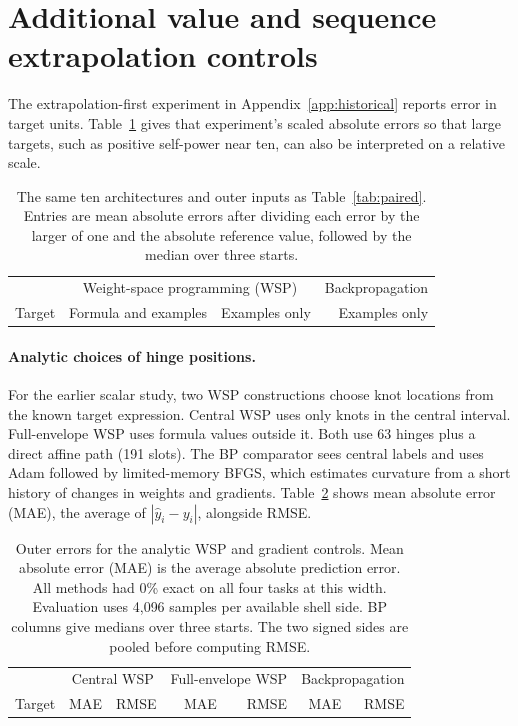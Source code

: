 \section{Additional value and sequence extrapolation controls}\label{app:additional}
The extrapolation-first experiment in Appendix~\ref{app:historical} reports error in target units. Table~\ref{tab:scaled} gives that experiment's scaled absolute errors so that large targets, such as positive self-power near ten, can also be interpreted on a relative scale.

\begin{table}[htbp]\centering\small
\caption{The same ten architectures and outer inputs as Table~\ref{tab:paired}. Entries are mean absolute errors after dividing each error by the larger of one and the absolute reference value, followed by the median over three starts.}\label{tab:scaled}
\begin{tabular}{@{}lrrr@{}}\toprule
&\multicolumn{2}{c}{Weight-space programming (WSP)}&Backpropagation\\
Target & Formula and examples & Examples only & Examples only\\\midrule
\end{tabular}\end{table}

\paragraph{Analytic choices of hinge positions.}
For the earlier scalar study, two WSP constructions choose knot locations from the known target expression. Central WSP uses only knots in the central interval. Full-envelope WSP uses formula values outside it. Both use 63 hinges plus a direct affine path (191 slots). The BP comparator sees central labels and uses Adam followed by limited-memory BFGS, which estimates curvature from a short history of changes in weights and gradients. Table~\ref{tab:scalar} shows mean absolute error (MAE), the average of $|\hat y_i-y_i|$, alongside RMSE.

\begin{table}[htbp]\centering\small\setlength{\tabcolsep}{4pt}
\caption{Outer errors for the analytic WSP and gradient controls. Mean absolute error (MAE) is the average absolute prediction error. All methods had 0\% exact on all four tasks at this width. Evaluation uses 4,096 samples per available shell side. BP columns give medians over three starts. The two signed sides are pooled before computing RMSE.}\label{tab:scalar}
\begin{tabular}{@{}l rr rr rr@{}}\toprule
&\multicolumn{2}{c}{Central WSP}&\multicolumn{2}{c}{Full-envelope WSP}&\multicolumn{2}{c}{Backpropagation}\\
Target&MAE&RMSE&MAE&RMSE&MAE&RMSE\\\midrule
\end{tabular}\end{table}

